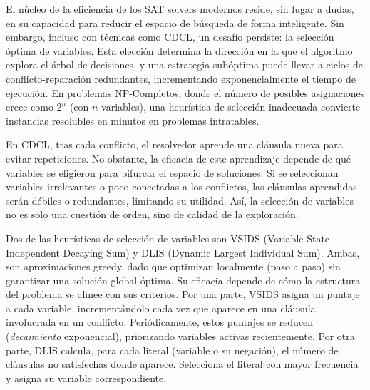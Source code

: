 
El núcleo de la eficiencia de los SAT solvers modernos reside, sin lugar a dudas, en su capacidad para reducir el espacio de búsqueda de forma inteligente. Sin embargo, incluso con técnicas como CDCL, un desafío persiste: la selección óptima de variables. Esta elección determina la dirección en la que el algoritmo explora el árbol de decisiones, y una estrategia subóptima puede llevar a ciclos de conflicto-reparación redundantes, incrementando exponencialmente el tiempo de ejecución. En problemas NP-Completos, donde el número de posibles asignaciones crece como $2^n$ (con $n$ variables), una heurística de selección inadecuada convierte instancias resolubles en minutos en problemas intratables.

En CDCL, tras cada conflicto, el resolvedor aprende una cláusula nueva para evitar repeticiones. No obstante, la eficacia de este aprendizaje depende de qué variables se eligieron para bifurcar el espacio de soluciones. Si se seleccionan variables irrelevantes o poco conectadas a los conflictos, las cláusulas aprendidas serán débiles o redundantes, limitando su utilidad. Así, la selección de variables no es solo una cuestión de orden, sino de calidad de la exploración.

Dos de las heurísticas de selección de variables son VSIDS (Variable State Independent Decaying Sum) y DLIS (Dynamic Largest Individual Sum). Ambas, son aproximaciones greedy, dado que optimizan localmente (paso a paso) sin garantizar una solución global óptima. Su eficacia depende de cómo la estructura del problema se alinee con sus criterios. Por una parte, VSIDS asigna un puntaje a cada variable, incrementándolo cada vez que aparece en una cláusula involucrada en un conflicto. Periódicamente, estos puntajes se reducen (\textit{decaimiento} exponencial), priorizando variables activas recientemente. Por otra parte, DLIS calcula, para cada literal (variable o su negación), el número de cláusulas no satisfechas donde aparece. Selecciona el literal con mayor frecuencia y asigna su variable correspondiente.




